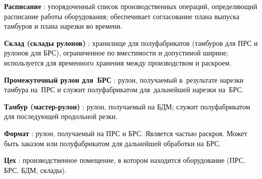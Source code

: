 \textbf{Расписание} : упорядоченный список производственных операций, определяющий расписание работы оборудования; обеспечивает согласование плана выпуска тамбуров и плана нарезки во времени.

\textbf{Склад (склады рулонов)} : хранилище для полуфабрикатов (тамбуров для ПРС и рулонов для БРС), ограниченное по вместимости и допустимой ширине; используется для временного хранения между производством и раскроем.

\textbf{Промежуточный рулон для~БРС} : рулон, получаемый в~результате нарезки тамбура на~ПРС и служит полуфабрикатом для~дальнейшей нарезки на~БРС.

\textbf{Тамбур (мастер-рулон)} : рулон, получаемый на БДМ; служит полуфабрикатом для последующей продольной резки.

\textbf{Формат} : рулон, получаемый на ПРС и БРС. Является частью раскроя. Может быть заказом или полуфабрикатом для дальнейшей обработки на БРС.

\textbf{Цех} : производственное помещение, в котором находится оборудование (ПРС, БРС, БДМ, склады).